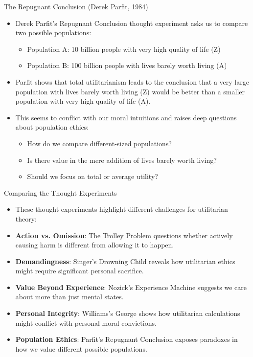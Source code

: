 \documentclass[aspectratio=169]{beamer}
\begin{document}
\begin{frame}{The Repugnant Conclusion (Derek Parfit, 1984)}
    \begin{itemize}
        \item Derek Parfit's Repugnant Conclusion thought experiment asks us to compare two possible populations:
            \begin{itemize}
                \item Population A: 10 billion people with very high quality of life (Z)
                \item Population B: 100 billion people with lives barely worth living (A)
            \end{itemize}
        \item Parfit shows that total utilitarianism leads to the conclusion that a very large population with lives barely worth living (Z) would be better than a smaller population with very high quality of life (A).
        
        \item This seems to conflict with our moral intuitions and raises deep questions about population ethics:
            \begin{itemize}
                \item How do we compare different-sized populations?
                \item Is there value in the mere addition of lives barely worth living?
                \item Should we focus on total or average utility?
            \end{itemize}
    \end{itemize}
\end{frame}

\begin{frame}{Comparing the Thought Experiments}
    \begin{itemize}
        \item These thought experiments highlight different challenges for utilitarian theory:
        
        \item \textbf{Action vs. Omission}: The Trolley Problem questions whether actively causing harm is different from allowing it to happen.
        
        \item \textbf{Demandingness}: Singer's Drowning Child reveals how utilitarian ethics might require significant personal sacrifice.
        
        \item \textbf{Value Beyond Experience}: Nozick's Experience Machine suggests we care about more than just mental states.
        
        \item \textbf{Personal Integrity}: Williams's George shows how utilitarian calculations might conflict with personal moral convictions.
        
        \item \textbf{Population Ethics}: Parfit's Repugnant Conclusion exposes paradoxes in how we value different possible populations.
    \end{itemize}
\end{frame}
\end{document}
